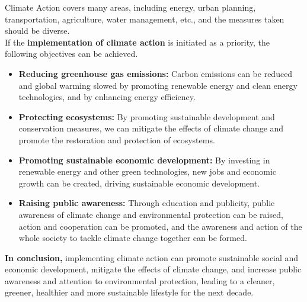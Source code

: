 Climate Action covers many areas, including energy, urban planning, transportation, agriculture, water management, etc., and the measures taken should be diverse.\\


If the \textbf{implementation of climate action} is initiated as a priority, the following objectives can be achieved.

\begin{itemize}
\item \textbf{Reducing greenhouse gas emissions:} Carbon emissions can be reduced and global warming slowed by promoting renewable energy and clean energy technologies, and by enhancing energy efficiency.
\item \textbf{Protecting ecosystems:} By promoting sustainable development and conservation measures, we can mitigate the effects of climate change and promote the restoration and protection of ecosystems.
\item \textbf{Promoting sustainable economic development:} By investing in renewable energy and other green technologies, new jobs and economic growth can be created, driving sustainable economic development.
\item \textbf{Raising public awareness:} Through education and publicity, public awareness of climate change and environmental protection can be raised, action and cooperation can be promoted, and the awareness and action of the whole society to tackle climate change together can be formed.
\end{itemize}

\textbf{In conclusion,} implementing climate action can promote sustainable social and economic development, mitigate the effects of climate change, and increase public awareness and attention to environmental protection, leading to a cleaner, greener, healthier and more sustainable lifestyle for the next decade.

